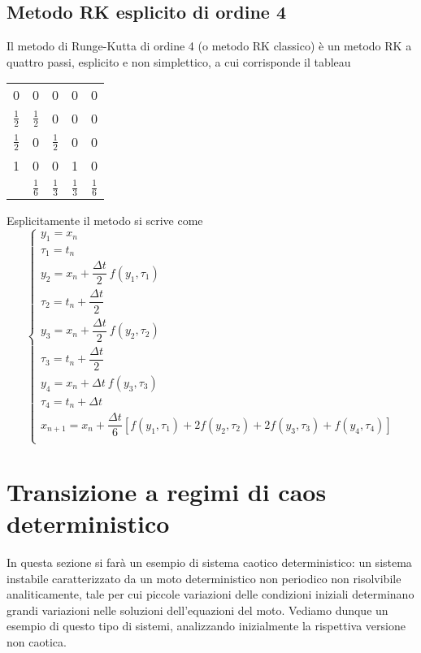 \subsection{Metodo RK esplicito di ordine 4}
Il metodo di Runge-Kutta di ordine 4 (o metodo RK classico) è un metodo RK a quattro passi, esplicito e non simplettico, a cui corrisponde il tableau
\begin{center}
\begin{tabular}{c|cccc}
0 & 0 & 0 & 0 & 0 \\[0.3em]
$\frac{1}{2}$ & $\frac{1}{2}$ & 0 & 0 & 0 \\[0.3em]
$\frac{1}{2}$ & 0 & $\frac{1}{2}$ & 0 & 0 \\[0.3em]
1 & 0 & 0 & 1 & 0 \\[0.3em]
\midrule
& $\frac{1}{6}$ & $\frac{1}{3}$ & $\frac{1}{3}$ & $\frac{1}{6}$ \\
\end{tabular}
\end{center}
Esplicitamente il metodo si scrive come
\[
\begin{cases}
y_1 = x_n \\[0.6em]
\tau_1 = t_n \\[0.6em]
y_2 = x_n + \dfrac{\Delta t}{2} \ f(y_1,\tau_1) \\[0.6em]
\tau_2 = t_n + \dfrac{\Delta t}{2} \\[0.6em]
y_3 = x_n + \dfrac{\Delta t}{2} \ f(y_2, \tau_2) \\[0.6em]
\tau_3 = t_n + \dfrac{\Delta t}{2} \\[0.6em]
y_4 = x_n + \Delta t \ f(y_3, \tau_3) \\[0.6em]
\tau_4 = t_n + \Delta t \\[0.6em]
x_{n+1} = x_n + \dfrac{\Delta t}{6} [f(y_1,\tau_1) + 2 f(y_2,\tau_2) + 2 f(y_3,\tau_3) + f(y_4,\tau_4)] \\
\end{cases}
\]






\section{Transizione a regimi di caos deterministico}

In questa sezione si farà un esempio di sistema caotico deterministico: un sistema instabile caratterizzato da un moto deterministico non periodico non risolvibile analiticamente, tale per cui piccole variazioni delle condizioni iniziali determinano grandi variazioni nelle soluzioni dell'equazioni del moto. Vediamo dunque un esempio di questo tipo di sistemi, analizzando inizialmente la rispettiva versione non caotica.

